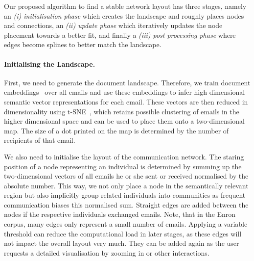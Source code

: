 Our proposed algorithm to find a stable network layout has three stages, namely an \textit{(i) initialisation phase} which creates the landscape and roughly places nodes and connections, an \textit{(ii) update phase} which iteratively updates the node placement towards a better fit, and finally a \textit{(iii) post processing phase} where edges become splines to better match the landscape.




\paragraph{Initialising the Landscape.}
First, we need to generate the document landscape.
Therefore, we train document embeddings~\cite{le2014distributed,hu2017} over all emails and use these embeddings to infer high dimensional semantic vector representations for each email.
These vectors are then reduced in dimensionality using t-SNE~\cite{maaten2008visualizing}, which retains possible clustering of emails in the higher dimensional space and can be used to place them onto a two-dimensional map.
The size of a dot printed on the map is determined by the number of recipients of that email.

We also need to initialise the layout of the communication network.
The staring position of a node representing an individual is determined by summing up the two-dimensional vectors of all emails he or she sent or received normalised by the absolute number.
This way, we not only place a node in the semantically relevant region but also implicitly group related individuals into communities as frequent communication biases this normalised sum.
Straight edges are added between the nodes if the respective individuals exchanged emails.
Note, that in the Enron corpus, many edges only represent a small number of emails.
Applying a variable threshold can reduce the computational load in later stages, as these edges will not impact the overall layout very much.
They can be added again as the user requests a detailed visualisation by zooming in or other interactions.

